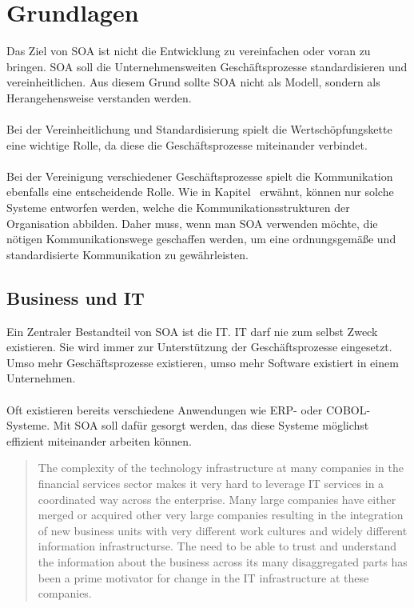 \section{Grundlagen}
\label{sec:Grundlagen}
Das Ziel von SOA ist nicht die Entwicklung zu vereinfachen oder voran zu bringen. SOA soll die Unternehmensweiten Geschäftsprozesse standardisieren und vereinheitlichen. Aus diesem Grund sollte SOA nicht als Modell, sondern als Herangehensweise verstanden werden.
\\\\
Bei der Vereinheitlichung und Standardisierung spielt die Wertschöpfungskette eine wichtige Rolle, da diese die Geschäftsprozesse miteinander verbindet.
\\\\
Bei der Vereinigung verschiedener Geschäftsprozesse spielt die Kommunikation ebenfalls eine entscheidende Rolle. Wie in Kapitel \ erwähnt, können nur solche Systeme entworfen werden, welche die Kommunikationsstrukturen der Organisation abbilden. Daher muss, wenn man SOA verwenden möchte, die nötigen Kommunikationswege geschaffen werden, um eine ordnungsgemäße und standardisierte Kommunikation zu gewährleisten.

\subsection{Business und IT}
\label{subsec:BusinessAndIT}
Ein Zentraler Bestandteil von SOA ist die IT. IT darf nie zum selbst Zweck existieren. Sie wird immer zur Unterstützung der Geschäftsprozesse eingesetzt. Umso mehr Geschäftsprozesse existieren, umso mehr Software existiert in einem Unternehmen.
\\\\
Oft existieren bereits verschiedene Anwendungen wie ERP- oder COBOL-Systeme. Mit SOA soll dafür gesorgt werden, das diese Systeme möglichst effizient miteinander arbeiten können.
\begin{quotation}
    \frqq The complexity of the technology infrastructure at many companies in the financial services sector makes it very hard to leverage IT services in a coordinated way across the enterprise. Many large companies have either merged or acquired other very large companies resulting in the integration of new business units with very different work cultures and widely different information infrastructurse. The need to be able to trust and understand the information about the business across its many disaggregated parts has been a prime motivator for change in the IT infrastructure at these companies.\flqq \cite[S. 17]{SOAForDummies}
\end{quotation}

